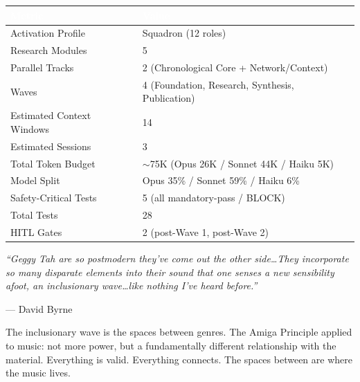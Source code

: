 \documentclass[11pt,letterpaper]{article}
\newcommand{\tableheader}[1]{\textbf{\sffamily\textcolor{white}{#1}}}
\begin{document}
\begin{center}
\begin{tabularx}{\textwidth}{L{5cm}X}
\toprule
{}
\tableheader{Metric} & \tableheader{Value} \\
\midrule
Activation Profile & Squadron (12 roles) \\
Research Modules & 5 \\
Parallel Tracks & 2 (Chronological Core + Network/Context) \\
Waves & 4 (Foundation, Research, Synthesis, Publication) \\
Estimated Context Windows & 14 \\
Estimated Sessions & 3 \\
Total Token Budget & $\sim$75K (Opus 26K / Sonnet 44K / Haiku 5K) \\
Model Split & Opus 35\% / Sonnet 59\% / Haiku 6\% \\
Safety-Critical Tests & 5 (all mandatory-pass / BLOCK) \\
Total Tests & 28 \\
HITL Gates & 2 (post-Wave 1, post-Wave 2) \\
\bottomrule
\end{tabularx}
\end{center}

\vspace{1em}

\begin{quotebox}
\textit{``Geggy Tah are so postmodern they've come out the other side\ldots They incorporate so many disparate elements into their sound that one senses a new sensibility afoot, an inclusionary wave\ldots like nothing I've heard before.''}

\vspace{0.5em}
\hfill --- David Byrne

\vspace{1em}
The inclusionary wave is the spaces between genres. The Amiga Principle applied to music: not more power, but a fundamentally different relationship with the material. Everything is valid. Everything connects. The spaces between are where the music lives.
\end{quotebox}
\end{document}
